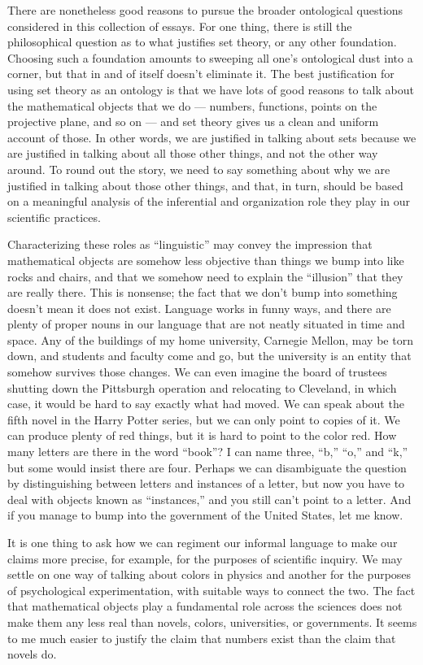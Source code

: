 \documentclass[11pt]{article}
\begin{document}
There are nonetheless good reasons to pursue the broader ontological questions considered in this collection of essays. For one thing, there is still the philosophical question as to what justifies set theory, or any other foundation. Choosing such a foundation amounts to sweeping all one's ontological dust into a corner, but that in and of itself doesn't eliminate it. The best justification for using set theory as an ontology is that we have lots of good reasons to talk about the mathematical objects that we do --- numbers, functions, points on the projective plane, and so on --- and set theory gives us a clean and uniform account of those. In other words, we are justified in talking about sets because we are justified in talking about all those other things, and not the other way around. To round out the story, we need to say something about why we are justified in talking about those other things, and that, in turn, should be based on a meaningful analysis of the inferential and organization role they play in our scientific practices.

Characterizing these roles as ``linguistic'' may convey the impression that mathematical objects are somehow less objective than things we bump into like rocks and chairs, and that we somehow need to explain the ``illusion'' that they are really there. This is nonsense; the fact that we don't bump into something doesn't mean it does not exist. Language works in funny ways, and there are plenty of proper nouns in our language that are not neatly situated in time and space. Any of the buildings of my home university, Carnegie Mellon, may be torn down, and students and faculty come and go, but the university is an entity that somehow survives those changes. We can even imagine the board of trustees shutting down the Pittsburgh operation and relocating to Cleveland, in which case, it would be hard to say exactly what had moved. We can speak about the fifth novel in the Harry Potter series, but we can only point to copies of it. We can produce plenty of red things, but it is hard to point to the color red. How many letters are there in the word ``book''? I can name three, ``b,'' ``o,'' and ``k,'' but some would insist there are four. Perhaps we can disambiguate the question by distinguishing between letters and instances of a letter, but now you have to deal with objects known as ``instances,'' and you still can't point to a letter. And if you manage to bump into the government of the United States, let me know.

It is one thing to ask how we can regiment our informal language to make our claims more precise, for example, for the purposes of scientific inquiry. We may settle on one way of talking about colors in physics and another for the purposes of psychological experimentation, with suitable ways to connect the two. The fact that mathematical objects play a fundamental role across the sciences does not make them any less real than novels, colors, universities, or governments. It seems to me much easier to justify the claim that numbers exist than the claim that novels do.
\end{document}

